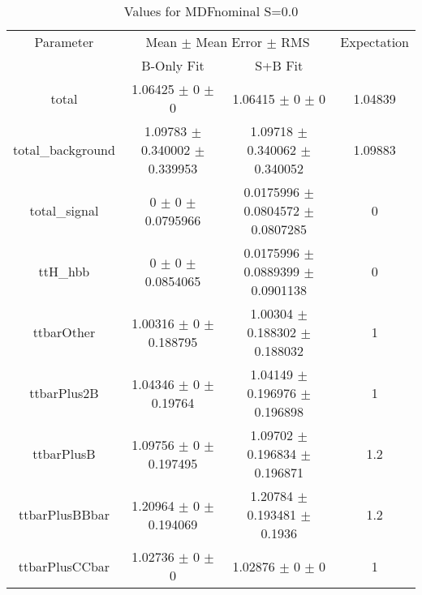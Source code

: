 \begin{table}
\centering
\caption{Values for MDFnominal S=0.0}
\begin{tabular}{cccc}
\toprule
Parameter & \multicolumn{2}{c}{Mean $\pm$ Mean Error $\pm$ RMS} & Expectation\\
 & B-Only Fit & S+B Fit & \\
\midrule
total & \num{1.06425} $\pm$ \num{0} $\pm$ \num{0} & \num{1.06415} $\pm$ \num{0} $\pm$ \num{0} & \num{1.04839}\\
total\_background & \num{1.09783} $\pm$ \num{0.340002} $\pm$ \num{0.339953} & \num{1.09718} $\pm$ \num{0.340062} $\pm$ \num{0.340052} & \num{1.09883}\\
total\_signal & \num{0} $\pm$ \num{0} $\pm$ \num{0.0795966} & \num{0.0175996} $\pm$ \num{0.0804572} $\pm$ \num{0.0807285} & \num{0}\\
ttH\_hbb & \num{0} $\pm$ \num{0} $\pm$ \num{0.0854065} & \num{0.0175996} $\pm$ \num{0.0889399} $\pm$ \num{0.0901138} & \num{0}\\
ttbarOther & \num{1.00316} $\pm$ \num{0} $\pm$ \num{0.188795} & \num{1.00304} $\pm$ \num{0.188302} $\pm$ \num{0.188032} & \num{1}\\
ttbarPlus2B & \num{1.04346} $\pm$ \num{0} $\pm$ \num{0.19764} & \num{1.04149} $\pm$ \num{0.196976} $\pm$ \num{0.196898} & \num{1}\\
ttbarPlusB & \num{1.09756} $\pm$ \num{0} $\pm$ \num{0.197495} & \num{1.09702} $\pm$ \num{0.196834} $\pm$ \num{0.196871} & \num{1.2}\\
ttbarPlusBBbar & \num{1.20964} $\pm$ \num{0} $\pm$ \num{0.194069} & \num{1.20784} $\pm$ \num{0.193481} $\pm$ \num{0.1936} & \num{1.2}\\
ttbarPlusCCbar & \num{1.02736} $\pm$ \num{0} $\pm$ \num{0} & \num{1.02876} $\pm$ \num{0} $\pm$ \num{0} & \num{1}\\
\bottomrule
\end{tabular}
\end{table}